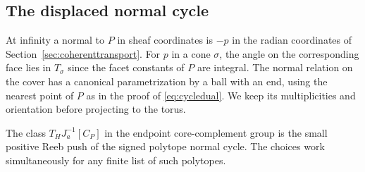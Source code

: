 \subsection{The displaced normal cycle}
At infinity a normal to $P$ in sheaf coordinates is $-p$ in the radian coordinates of Section~\ref{sec:coherenttransport}. For $p$ in a cone $\sigma$, the angle on the corresponding face lies in $T_\sigma$ since the facet constants of $P$ are integral. The normal relation on the cover has a canonical parametrization by a ball with an end, using the nearest point of $P$ as in the proof of \eqref{eq:cycledual}. We keep its multiplicities and orientation before projecting to the torus.

\begin{lemma}\label{lem:positivepush}
The class $T_H J_a^{-1}[C_P]$ in the endpoint core-complement group is the small positive Reeb push of the signed polytope normal cycle. The choices work simultaneously for any finite list of such polytopes.
\end{lemma}


